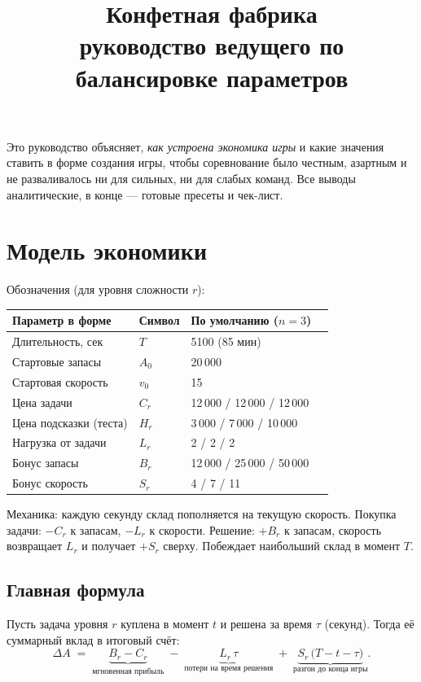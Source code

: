 \documentclass[12pt,a4paper]{article}
\title{\textbf{\textcolor{choco}{Конфетная фабрика}}\\[4pt]
\large руководство ведущего по балансировке параметров}
\date{}
\newcommand{\A}{A_0}
\newcommand{\vv}{v_0}
\begin{document}
\maketitle
\vspace{-2.5em}

Это руководство объясняет, \emph{как устроена экономика игры} и какие
значения ставить в форме создания игры, чтобы соревнование было честным,
азартным и не разваливалось ни для сильных, ни для слабых команд.
Все выводы аналитические, в конце --- готовые пресеты и чек-лист.

\section{Модель экономики}

Обозначения (для уровня сложности $r$):

\begin{center}
\begin{tabular}{llll}
\toprule
Параметр в форме & Символ & По умолчанию ($n=3$) \\
\midrule
Длительность, сек        & $T$      & 5100 (85 мин) \\
Стартовые запасы         & $\A$     & 20\,000 \\
Стартовая скорость       & $\vv$    & 15 \\
Цена задачи              & $C_r$    & 12\,000 / 12\,000 / 12\,000 \\
Цена подсказки (теста)   & $H_r$    & 3\,000 / 7\,000 / 10\,000 \\
Нагрузка от задачи       & $L_r$    & 2 / 2 / 2 \\
Бонус запасы             & $B_r$    & 12\,000 / 25\,000 / 50\,000 \\
Бонус скорость           & $S_r$    & 4 / 7 / 11 \\
\bottomrule
\end{tabular}
\end{center}

Механика: каждую секунду склад пополняется на текущую скорость.
Покупка задачи: $-C_r$ к запасам, $-L_r$ к скорости. Решение:
$+B_r$ к запасам, скорость возвращает $L_r$ и получает $+S_r$ сверху.
Побеждает наибольший склад в момент $T$.

\subsection{Главная формула}

Пусть задача уровня $r$ куплена в момент $t$ и решена за время $\tau$
(секунд). Тогда её суммарный вклад в итоговый счёт:
\begin{equation}
\Delta A \;=\; \underbrace{B_r - C_r}_{\text{мгновенная прибыль}}
\;-\; \underbrace{L_r\,\tau}_{\text{потери на время решения}}
\;+\; \underbrace{S_r\,\bigl(T - t - \tau\bigr)}_{\text{разгон до конца игры}}.
\label{eq:profit}
\end{equation}
\end{document}
